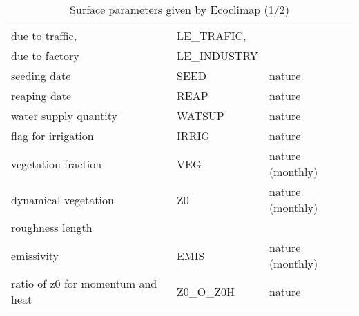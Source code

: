 \begin{table}[h]
\begin{center}
\begin{tabular}{|l|l|l| }
due to traffic, & LE\_TRAFIC,& \\
due to factory & LE\_INDUSTRY & \\
\hline
seeding date & SEED & nature \\
\hline
reaping date & REAP & nature \\
\hline
water supply quantity & WATSUP & nature \\
\hline
flag for irrigation & IRRIG & nature \\
\hline
vegetation fraction & VEG & nature (monthly)\\
\hline
dynamical vegetation  & Z0 & nature (monthly)\\
roughness length & & \\
\hline
emissivity & EMIS & nature (monthly) \\
\hline
ratio of z0 for momentum and heat & Z0\_O\_Z0H & nature  \\
\hline
\end{tabular}
\end{center}
\caption{Surface parameters given by Ecoclimap (1/2)}
\label{tab2a}
\end{table}

